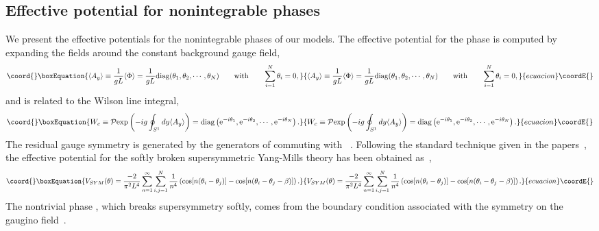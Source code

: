 \documentclass[a4paper,12pt]{article}
\begin{document}
\subsection{Effective potential for nonintegrable phases}
We present the effective potentials for the nonintegrable phases 
of our models. The effective potential for the 
phase is computed by expanding the fields around the constant 
background gauge field,
\begin{equation}\coord{}\boxEquation{
\vev{A_y}\equiv {1\over{gL}}\vev{\Phi}={1\over {gL}}
{\rm diag}(\theta_1, \theta_2,\cdots, \theta_{N})\qquad {\rm with}\qquad
\sum_{i=1}^N\theta_i=0,
\label{background}
}{
\vev{A_y}\equiv {1\over{gL}}\vev{\Phi}={1\over {gL}}
{\rm diag}(\theta_1, \theta_2,\cdots, \theta_{N})\qquad {\rm with}\qquad
\sum_{i=1}^N\theta_i=0,
}{ecuacion}\coordE{}\end{equation} 
and \coordHE{} is related to the Wilson line integral,
\begin{equation}\coord{}\boxEquation{
W_c\equiv {\cal P}{\rm exp}\left({-ig \oint_{S^1}dy \vev{A_y}}\right)=
{\rm diag}\left(\e^{-i\theta_1}, \e^{-i\theta_2}, \cdots, \e^{-i\theta_N}
\right).
}{
W_c\equiv {\cal P}{\rm exp}\left({-ig \oint_{S^1}dy \vev{A_y}}\right)=
{\rm diag}\left(\e^{-i\theta_1}, \e^{-i\theta_2}, \cdots, \e^{-i\theta_N}
\right).
}{ecuacion}\coordE{}\end{equation}
The residual gauge symmetry is generated by the 
generators of \coordHE{} commuting with \coordHE{}~\cite{hosotanib}. 
Following the standard technique given in the 
papers~\cite{hosotani, hosotanib}, 
the effective potential for the softly broken \coordHE{} supersymmetric 
Yang-Mills theory has been obtained as~\cite{takenaga},
\begin{equation}\coord{}\boxEquation{
V_{SYM}(\theta)={{-2}\over {\pi^2L^4}}
\sum_{n=1}^{\infty}\sum_{i,j=1}^{N}{1\over n^4}
\left(\cos[n(\theta_i-\theta_j)]
-\cos[n(\theta_i-\theta_j-\beta)]\right).
\label{symeff}
}{
V_{SYM}(\theta)={{-2}\over {\pi^2L^4}}
\sum_{n=1}^{\infty}\sum_{i,j=1}^{N}{1\over n^4}
\left(\cos[n(\theta_i-\theta_j)]
-\cos[n(\theta_i-\theta_j-\beta)]\right).
}{ecuacion}\coordE{}\end{equation}
The nontrivial phase \myHighlight{$\beta$}\coordHE{}, which breaks supersymmetry softly, comes from
the boundary condition associated with the \coordHE{} symmetry on the gaugino
field~\cite{takenaga, takenagac}.
\end{document}
